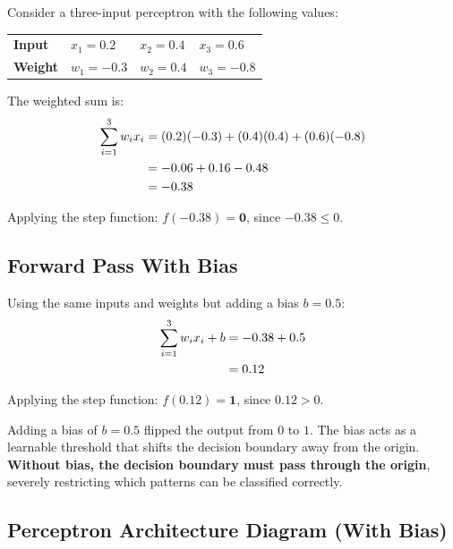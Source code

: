 \documentclass[12pt,a4paper]{article}
\begin{document}
Consider a three-input perceptron with the following values:

\begin{center}
\begin{tabular}{llll}
\toprule
\textbf{Input} & $x_1 = 0.2$ & $x_2 = 0.4$ & $x_3 = 0.6$ \\
\textbf{Weight} & $w_1 = -0.3$ & $w_2 = 0.4$ & $w_3 = -0.8$ \\
\bottomrule
\end{tabular}
\end{center}

The weighted sum is:
\begin{align}
  \sum_{i=1}^{3} w_i x_i
    &= (0.2)(-0.3) + (0.4)(0.4) + (0.6)(-0.8) \notag \\
    &= -0.06 + 0.16 - 0.48 \notag \\
    &= -0.38
  \label{eq:ws-no-bias}
\end{align}

Applying the step function: $f(-0.38) = \mathbf{0}$, since $-0.38 \leq 0$.

\subsection{Forward Pass With Bias}
\label{subsec:with-bias}

Using the same inputs and weights but adding a bias $b = 0.5$:
\begin{align}
  \sum_{i=1}^{3} w_i x_i + b
    &= -0.38 + 0.5 \notag \\
    &= 0.12
  \label{eq:ws-bias}
\end{align}

Applying the step function: $f(0.12) = \mathbf{1}$, since $0.12 > 0$.

\begin{example}[title=Impact of the Bias Term]
Adding a bias of $b = 0.5$ flipped the output from $0$ to $1$.
The bias acts as a learnable threshold that shifts the decision boundary
away from the origin.
\textbf{Without bias, the decision boundary must pass through the origin},
severely restricting which patterns can be classified correctly.
\end{example}

\subsection{Perceptron Architecture Diagram (With Bias)}
\label{subsec:perceptron-arch-diagram}
\end{document}
